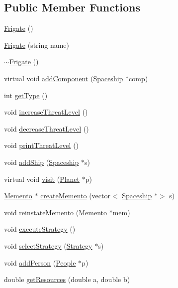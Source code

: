 \subsection*{Public Member Functions}
\begin{DoxyCompactItemize}
\item 
\hyperlink{classFrigate_ad68c1d421cc3872688a19727055632a2}{Frigate} ()
\item 
\hyperlink{classFrigate_a9904824a22b1784d1b5a9e742e8e0485}{Frigate} (string name)
\item 
\hyperlink{classFrigate_a86559f40e7725443c89039ee623fab2b}{$\sim$\+Frigate} ()
\item 
virtual void \hyperlink{classFrigate_af1c809e79096219e53da2f577ec8178d}{add\+Component} (\hyperlink{classSpaceship}{Spaceship} $\ast$comp)
\item 
int \hyperlink{classFrigate_a9716770249d0a26a114a69e5e3794bd9}{get\+Type} ()
\item 
void \hyperlink{classFrigate_ab4dd2319ec0a045e613c85b2c599a3e2}{increase\+Threat\+Level} ()
\item 
void \hyperlink{classFrigate_a756cc705b54d5aa48d4529bbfbeee74f}{decrease\+Threat\+Level} ()
\item 
void \hyperlink{classFrigate_a97f2fd73f269ee81e6f8185110769cc5}{print\+Threat\+Level} ()
\item 
void \hyperlink{classFrigate_a000802431ba3db8b45bfa6e7ae153de4}{add\+Ship} (\hyperlink{classSpaceship}{Spaceship} $\ast$s)
\item 
virtual void \hyperlink{classFrigate_a20d3fd7cedff77da127e562bd2e7e015}{visit} (\hyperlink{classPlanet}{Planet} $\ast$p)
\item 
\hyperlink{classMemento}{Memento} $\ast$ \hyperlink{classFrigate_a69d6b412c52d49b55135516d3e0b2a64}{create\+Memento} (vector$<$ \hyperlink{classSpaceship}{Spaceship} $\ast$$>$ s)
\item 
void \hyperlink{classFrigate_af6db10cd052dc5382857452dcb4e6d2a}{reinstate\+Memento} (\hyperlink{classMemento}{Memento} $\ast$mem)
\item 
void \hyperlink{classFrigate_a53468965646268e73e9cf49c3b013c40}{execute\+Strategy} ()
\item 
void \hyperlink{classFrigate_a484e16990cddb79fbc51ff29e815fec5}{select\+Strategy} (\hyperlink{classStrategy}{Strategy} $\ast$s)
\item 
void \hyperlink{classFrigate_a5da866e084d1d07363f06ff052005b41}{add\+Person} (\hyperlink{classPeople}{People} $\ast$p)
\item 
double \hyperlink{classFrigate_a333512076606313c57fc9957dccf9cb9}{get\+Resources} (double a, double b)
\end{DoxyCompactItemize}
